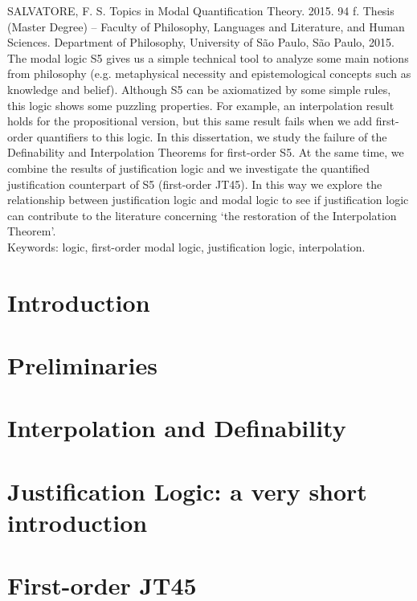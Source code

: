 \documentclass[12pt]{report}
\theoremstyle{definition}
\begin{document}
SALVATORE, F. S. Topics in Modal Quantification Theory. 2015. 94 f. Thesis (Master Degree) -- Faculty of Philosophy, Languages and Literature, and Human Sciences. Department of Philosophy, University of S\~ao Paulo, S\~ao Paulo, 2015.\\

The modal logic S5 gives us a simple technical tool to analyze some main notions from philosophy (e.g. metaphysical necessity and epistemological concepts such as knowledge and belief). Although S5 can be axiomatized by some simple rules, this logic shows some puzzling properties. For example, an interpolation result holds for the propositional version, but this same result fails when we add first-order quantifiers to this logic. In this dissertation, we study the failure of the Definability and Interpolation Theorems for first-order S5. At the same time, we combine the results of justification logic and we investigate the quantified justification counterpart of S5 (first-order JT45). In this way we explore the relationship between justification logic and modal logic to see if justification logic can contribute to the literature concerning `the restoration of the Interpolation Theorem'.\\

Keywords: logic, first-order modal logic, justification logic, interpolation.




\tableofcontents{}

\chapter{Introduction}


\chapter{Preliminaries}


\chapter{Interpolation and Definability}


\chapter{Justification Logic: a very short introduction}


\chapter{First-order JT45}

\end{document}

